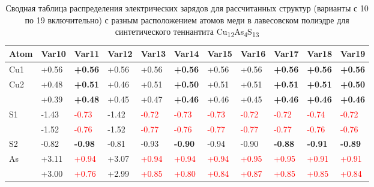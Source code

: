 \begin{landscape}
\begin{table} [htbp]
\centering
\caption{Сводная таблица распределения электрических зарядов для рассчитанных структур (варианты с 10 по 19 включительно) с разным расположением атомов меди в лавесовском полиэдре для синтетического теннантита Cu\textsubscript{12}As\textsubscript{4}S\textsubscript{13}}%
	\label{mod_char2}%
    \renewcommand{\arraystretch}{1.5}
	\begin{tabular}{@{}@{\extracolsep{10pt}}lllllllllll@{}}

\toprule     %
Atom                         &Var10& Var11& Var12& Var13 & Var14& Var15& Var16& Var17& Var18& Var19          \\ \hline
Cu1                  & +0.56   & 	{\bf +0.56 }           & 	+0.56  & 	+0.56                  & 	{\bf +0.56 }           & 	+0.56                  & 	+0.56                  & 	{\bf +0.56 }           & 	{\bf +0.56 }           & 	{\bf +0.56 } \\
\multirow{2}{*}{Cu2} & +0.48   & 	{\bf +0.51 }           & 	+0.46  & 	+0.51                  & 	{\bf +0.50 }           & 	+0.51                  & 	+0.51                  & 	{\bf +0.51 }           & 	{\bf +0.51 }           & 	{\bf +0.50 } \\
		                 & +0.39   & 	{\bf +0.48 }           & 	+0.45  & 	+0.47                  & 	{\bf +0.46 }           & 	+0.46                  & 	+0.45                  & {\bf +0.46 }            & 	{\bf +0.46 }           & 	{\bf +0.46 } \\
\multirow{2}{*}{S1}  & -1.43   & 	\textcolor{red}{-0.73} & 	-1.42  & 	\textcolor{red}{-0.72} & 	\textcolor{red}{-0.73} & 	\textcolor{red}{-0.73} & 	\textcolor{red}{-0.72} & 	\textcolor{red}{-0.72} & 	\textcolor{red}{-0.74} & 	\textcolor{red}{-0.72} \\
                     & -1.52   & 	\textcolor{red}{-0.76} & 	-1.52  & 	\textcolor{red}{-0.77} & 	\textcolor{red}{-0.76} & 	\textcolor{red}{-0.77} & 	\textcolor{red}{-0.77} & 	\textcolor{red}{-0.77} & 	\textcolor{red}{-0.76} & 	\textcolor{red}{-0.76} \\
S2                   & -0.82   & 	{\bf -0.98}            & 	-0.81  & 	-0.93                  & 	{\bf -0.90 }           & 	-0.94                  & 	-0.90                  & 	{\bf -0.88 }           & 	{\bf -0.91 }           & 	{\bf -0.89 } \\
\multirow{2}{*}{As}  & +3.11   & 	\textcolor{red}{+0.94} & 	+3.07  & \textcolor{red}{+0.94}  & 	\textcolor{red}{+0.94} & 	\textcolor{red}{+0.94} & 	\textcolor{red}{+0.95} & 	\textcolor{red}{+0.95} & 	\textcolor{red}{+0.91} & 	\textcolor{red}{+0.91} \\
	                   & +3.00	 & \textcolor{red}{+0.76}	 & +2.99	 & \textcolor{red}{+0.85}	 & \textcolor{red}{+0.80}	 & \textcolor{red}{+0.84}	 & \textcolor{red}{+0.87}	 & \textcolor{red}{+0.85}	 & \textcolor{red}{+0.85}	 & \textcolor{red}{+0.84} \\
 \bottomrule


\end{tabular}
\end{table}
\end{landscape}

